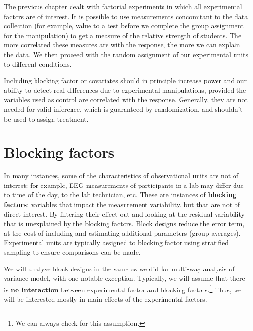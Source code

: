 \documentclass[
  11pt,
  letterpaper,
]{scrbook}
\theoremstyle{definition}
\theoremstyle{remark}
\begin{document}
The previous chapter dealt with factorial experiments in which all
experimental factors are of interest. It is possible to use measurements
concomitant to the data collection (for example, value to a test before
we complete the group assignment for the manipulation) to get a measure
of the relative strength of students. The more correlated these measures
are with the response, the more we can explain the data. We then proceed
with the random assignment of our experimental units to different
conditions.

Including blocking factor or covariates should in principle increase
power and our ability to detect real differences due to experimental
manipulations, provided the variables used as control are correlated
with the response. Generally, they are not needed for valid inference,
which is guaranteed by randomization, and shouldn't be used to assign
treatment.

\hypertarget{blocking-factors}{%
\section{Blocking factors}\label{blocking-factors}}

In many instances, some of the characteristics of observational units
are not of interest: for example, EEG measurements of participants in a
lab may differ due to time of the day, to the lab technician, etc. These
are instances of \textbf{blocking factors}: variables that impact the
measurement variability, but that are not of direct interest. By
filtering their effect out and looking at the residual variability that
is unexplained by the blocking factors. Block designs reduce the error
term, at the cost of including and estimating additional parameters
(group averages). Experimental units are typically assigned to blocking
factor using stratified sampling to ensure comparisons can be made.

We will analyse block designs in the same as we did for multi-way
analysis of variance model, with one notable exception. Typically, we
will assume that there is \textbf{no interaction} between experimental
factor and blocking factors.\footnote{We can always check for this
  assumption.} Thus, we will be interested mostly in main effects of the
experimental factors.
\end{document}

